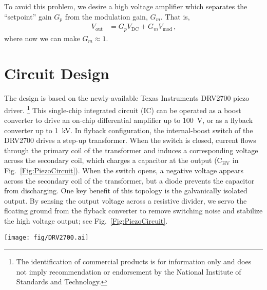 \documentclass[aip,rsi,reprint]{revtex4-1} %
\begin{document}
To avoid this problem, we desire a high voltage amplifier which separates the ``setpoint'' gain $G_p$ from the modulation gain, $G_m$. That is,
\begin{align}
  V_{\text{out}} &= G_p V_{\text{DC}} + G_m V_{\text{mod}}\, \text{,}
  \label{Eq:PiezoTransfer}
\end{align}
where now we can make $G_m \approx 1$.

\section{Circuit Design}
\label{Sec:Circuit}

The design is based on the newly-available Texas Instruments DRV2700 piezo driver.
\footnote{The identification of commercial products is for information only and does not imply recommendation or endorsement by the National Institute of Standards and Technology.}
This single-chip integrated circuit (IC) can be operated as a boost converter to drive an on-chip differential amplifier up to \SI{100}{\volt}, or as a flyback converter up to \SI{1}{\kilo\volt}.
In flyback configuration, the internal-boost switch of the DRV2700 drives a step-up transformer.
When the switch is closed, current flows through the primary coil of the transformer and induces a corresponding voltage across the secondary coil, which charges a capacitor at the output ($\text{C}_{\text{HV}}$ in Fig.~\ref{Fig:PiezoCircuit}).
When the switch opens, a negative voltage appears across the secondary coil of the transformer, but a diode prevents the capacitor from discharging.
One key benefit of this topology is the galvanically isolated output.
By sensing the output voltage across a resistive divider, we servo the floating ground from the flyback converter to remove switching noise and stabilize the high voltage output; see Fig.~\ref{Fig:PiezoCircuit}.

\begin{figure*}[t]
\texttt{[image: fig/DRV2700.ai]}
\caption{Schematic of the high voltage stabilization.
The voltage HV is generated using a Texas Instruments DRV2700 high voltage driver in flyback configuration (see Fig.~\ref{Fig:DRV2700}).
A fast, very high slew-rate op-amp senses the output voltage across $R_1$ and $R_2$, and servos it by modulating the node at ``HV floating gnd''.
The $V_{\text{DC}}$ gain is set by $\left(1+R_1/R_2\right)$, while the modulation gain is set by $-R_{\text{mod}}/R_{\text{fb}}$.
The capacitor linking the floating ground node to the output allows the op-amp to remove residual switching noise and stabilize the DC output according to the transfer function given in Eq.~(\ref{Eq:PiezoTransfer}). \label{Fig:PiezoCircuit}}
\end{figure*}
\end{document}
